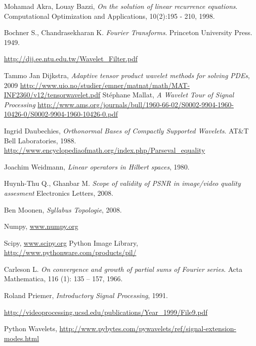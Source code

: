 \documentclass[11pt]{uvamath}
\theoremstyle{plain}
\theoremstyle{definition}
\theoremstyle{remark}
\begin{document}
\begin{thebibliography}{11}

  Mohamad Akra,  Louay Bazzi,
  \emph{On the solution of linear recurrence equations}.
  Computational Optimization and Applications,
  10(2):195 - 210,
  1998.

  Bochner S., Chandrasekharan K.
  \emph{Fourier Transforms}.
  Princeton University Press.
  1949.

  \url{http://djj.ee.ntu.edu.tw/Wavelet_Filter.pdf}

  Tammo Jan Dijkstra,
  \emph{Adaptive tensor product wavelet methods for solving PDEs}, 2009
  \url{http://www.uio.no/studier/emner/matnat/math/MAT-INF2360/v12/tensorwavelet.pdf}
  St\'ephane Mallat,
  \emph{A Wavelet Tour of Signal Processing}
  \url{http://www.ams.org/journals/bull/1960-66-02/S0002-9904-1960-10426-0/S0002-9904-1960-10426-0.pdf}

  Ingrid Daubechies, \emph{Orthonormal Bases of Compactly Supported Wavelets}.
  AT\&T Bell Laboratories, 1988.
  \url{http://www.encyclopediaofmath.org/index.php/Parseval_equality}

Joachim Weidmann, \emph{Linear operators in Hilbert spaces}, 1980.

  Huynh-Thu Q., Ghanbar M.
  \emph{Scope of validity of PSNR in image/video quality assesment}
  Electronics Letters, 2008.

  Ben Moonen, \emph{Syllabus Topologie}, 2008.

	Numpy, \url{www.numpy.org}
	
	Scipy, \url{www.scipy.org}
	Python Image Library, \url{http://www.pythonware.com/products/pil/}

  Carleson L.
  \emph{On convergence and growth of partial sums of Fourier series}. 
  Acta Mathematica,
  116 (1): 135 – 157,
  1966.

Roland Priemer, \emph{Introductory Signal Processing}, 1991. 

\url{http://videoprocessing.ucsd.edu/publications/Year_1999/File9.pdf}

	Python Wavelets, \url{http://www.pybytes.com/pywavelets/ref/signal-extension-modes.html}

\end{thebibliography}
\end{document}

